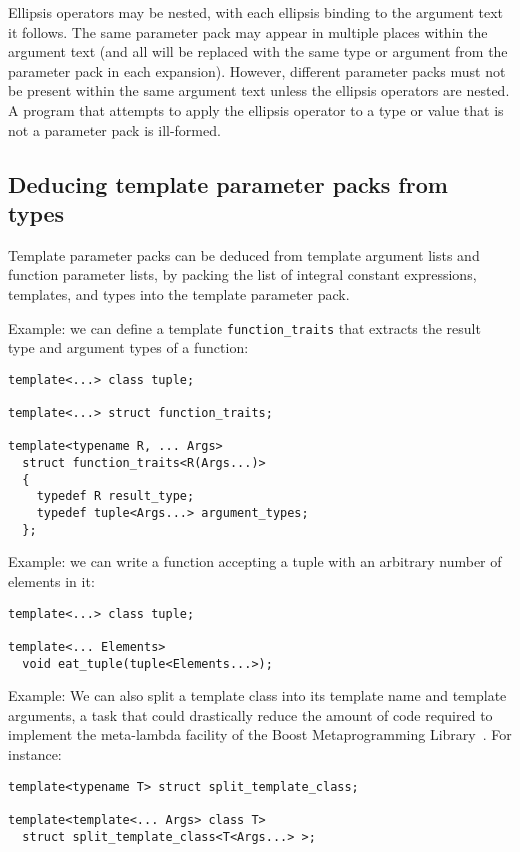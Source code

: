 \documentclass{article}
\begin{document}
Ellipsis operators may be nested, with each ellipsis binding to the
argument text it follows. The same parameter pack may appear in
multiple places within the argument text (and all will be replaced
with the same type or argument from the parameter pack in each
expansion). However, different parameter packs must not be present
within the same argument text unless the ellipsis operators are
nested. A program that attempts to apply the ellipsis operator to a
type or value that is not a parameter pack is ill-formed.

\subsection{Deducing template parameter packs from types}
Template parameter packs can be deduced from template argument lists
and function parameter lists, by packing the list of integral constant
expressions, templates, and types into the template parameter pack.

Example: we can define a template {\tt function\_traits} that extracts
the result type and argument types of a function:
\begin{verbatim}
template<...> class tuple;

template<...> struct function_traits;

template<typename R, ... Args> 
  struct function_traits<R(Args...)>
  { 
    typedef R result_type; 
    typedef tuple<Args...> argument_types;
  };
\end{verbatim}

Example: we can write a function accepting a tuple with an arbitrary
number of elements in it:
\begin{verbatim}
template<...> class tuple;

template<... Elements>
  void eat_tuple(tuple<Elements...>);
\end{verbatim}

Example: We can also split a template class into its template name and
template arguments, a task that could drastically reduce the amount of
code required to implement the meta-lambda facility of the Boost
Metaprogramming Library~\cite{Gurtovoy02}. For instance:

\begin{verbatim}
template<typename T> struct split_template_class;

template<template<... Args> class T> 
  struct split_template_class<T<Args...> >;
\end{verbatim}
\end{document}
